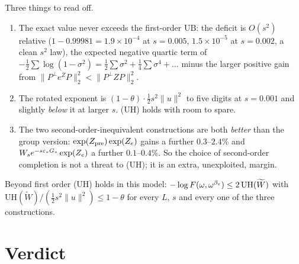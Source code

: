 \documentclass[11pt]{article}
\begin{document}
Three things to read off.
\begin{enumerate}[leftmargin=1.6em,itemsep=2pt]
\item The exact value never exceeds the first-order $\mathrm{UB}$: the deficit is
 $O(s^2)$ relative ($1-0.99981=1.9\times10^{-4}$ at $s=0.005$, $1.5\times10^{-5}$ at
 $s=0.002$, a clean $s^2$ law), the expected negative quartic term of
 $-\frac12\sum\log(1-\sigma^2)=\frac12\sum\sigma^2+\frac14\sum\sigma^4+\dots$ minus the
 larger positive gain from $\|P^\perp e^ZP\|_2^2<\|P^\perp ZP\|_2^2$.
\item The rotated exponent is $(1-\theta)\cdot\frac12 s^2\|u\|^2$ to five digits at
 $s=0.001$ and slightly \emph{below} it at larger $s$.  (UH) holds with room to spare.
\item The two second-order-inequivalent constructions are both \emph{better} than the
 group version: $\exp(Z_{\rm pre})\exp(Z_e)$ gains a further $0.3$--$2.4\%$ and
 $W_se^{-s\varepsilon_*G_*}\exp(Z_e)$ a further $0.1$--$0.4\%$.  So the choice of second-order
 completion is not a threat to (UH); it is an extra, unexploited, margin.
\end{enumerate}

\begin{verdictok}
Beyond first order (UH) holds in this model: $-\log F(\omega,\omega^{\beta_\varepsilon})\le
2\,\mathrm{UH}(\widetilde W)$ with $\mathrm{UH}(\widetilde W)/(\tfrac12 s^2\|u\|^2)\le1-\theta$
for every $L$, $s$ and every one of the three constructions.
\end{verdictok}


\section{Verdict}\label{sec:verdict}
\end{document}
